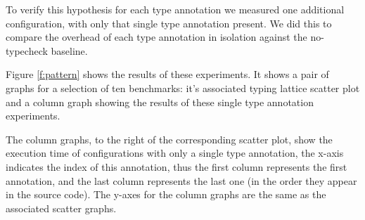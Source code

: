 \documentclass[sigplan,screen]{acmart}
\begin{document}

To verify this hypothesis 
for each type annotation we measured one additional
configuration, with only that single type annotation present.
We did this to compare the overhead of
each type annotation in isolation against the no-typecheck baseline.

Figure \ref{f:pattern} shows the results of these experiments.
It shows a pair of graphs for a selection of ten benchmarks: it's associated typing lattice scatter plot and a column graph showing the results of these single type annotation experiments.

The column graphs, to the right of the corresponding scatter plot, show the execution time of configurations with only a single type annotation, the x-axis indicates the index of this annotation, thus the first column represents the first annotation, and the last column represents the last one (in the order they appear in the source code). The y-axes for the column graphs are the same as the associated scatter graphs.

\end{document}
